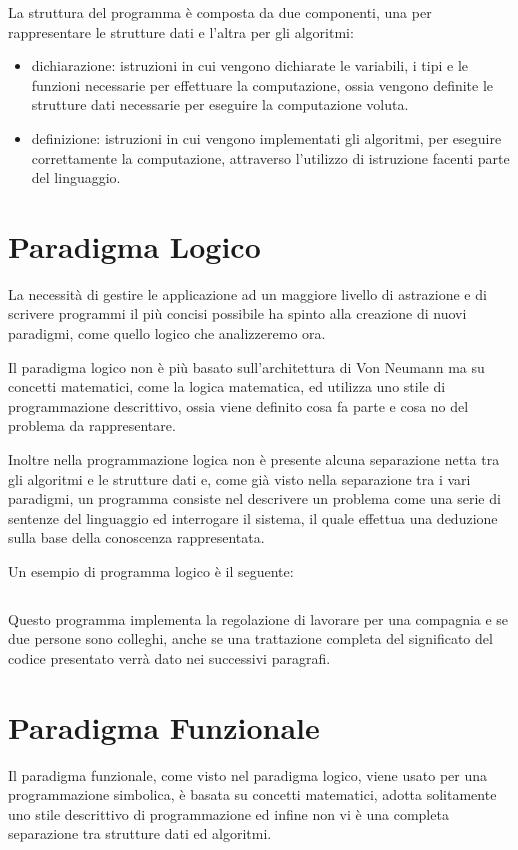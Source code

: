 \documentclass[a4paper]{report}
\begin{document}
La struttura del programma è composta da due componenti, una per rappresentare le strutture dati e l'altra per gli algoritmi:
\begin{itemize}
\item dichiarazione: istruzioni in cui vengono dichiarate le variabili, i tipi e le funzioni necessarie per effettuare
  la computazione, ossia vengono definite le strutture dati necessarie per eseguire la computazione voluta.
\item definizione: istruzioni in cui vengono implementati gli algoritmi, per eseguire correttamente la computazione, attraverso
  l'utilizzo di istruzione facenti parte del linguaggio.
\end{itemize}


\section{Paradigma Logico}
La necessità di gestire le applicazione ad un maggiore livello di astrazione e di scrivere programmi il più concisi possibile ha spinto
alla creazione di nuovi paradigmi, come quello logico che analizzeremo ora.

Il paradigma logico non è più basato sull'architettura di Von Neumann ma su concetti matematici, come la logica matematica,
ed utilizza uno stile di programmazione descrittivo, ossia viene definito cosa fa parte e cosa no del problema da rappresentare.

Inoltre nella programmazione logica non è presente alcuna separazione netta tra gli algoritmi e le strutture dati e, come già
visto nella separazione tra i vari paradigmi, un programma consiste nel descrivere un problema come una serie di sentenze del linguaggio
ed interrogare il sistema, il quale effettua una deduzione sulla base della conoscenza rappresentata.

Un esempio di programma logico è il seguente:
\inputminted{Prolog}{/esempi/employees.pl}
Questo programma implementa la regolazione di lavorare per una compagnia e se due persone sono colleghi, anche se una trattazione
completa del significato del codice presentato verrà dato nei successivi paragrafi.
\section{Paradigma Funzionale}
Il paradigma funzionale, come visto nel paradigma logico, viene usato per una programmazione simbolica, è basata su concetti matematici,
adotta solitamente uno stile descrittivo di programmazione ed infine non vi è una completa separazione tra strutture dati ed algoritmi.
\end{document}
